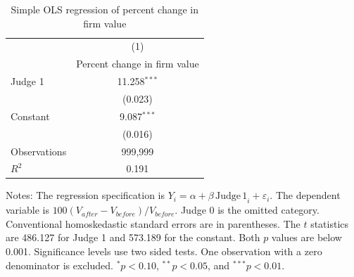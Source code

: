 \begin{table}[!htbp]
\centering
\caption{Simple OLS regression of percent change in firm value}
\label{tab:q4_ols}
\begin{tabular}{lc}
\toprule
 & (1) \\
 & Percent change in firm value \\
\midrule
Judge 1 & 11.258$^{***}$ \\
 & (0.023) \\
\addlinespace[2pt]
Constant & 9.087$^{***}$ \\
 & (0.016) \\
\midrule
Observations & 999,999 \\
$R^2$ & 0.191 \\
\bottomrule
\end{tabular}
\par\smallskip
\begin{minipage}{0.76\linewidth}
\footnotesize Notes: The regression specification is $Y_i = \alpha + \beta\,\mathrm{Judge\,1}_i + \varepsilon_i$. The dependent variable is $100(V_{after}-V_{before})/V_{before}$. Judge 0 is the omitted category. Conventional homoskedastic standard errors are in parentheses. The $t$ statistics are 486.127 for Judge 1 and 573.189 for the constant. Both $p$ values are below 0.001. Significance levels use two sided tests. One observation with a zero denominator is excluded. $^{*}p<0.10$, $^{**}p<0.05$, and $^{***}p<0.01$.
\end{minipage}
\end{table}
